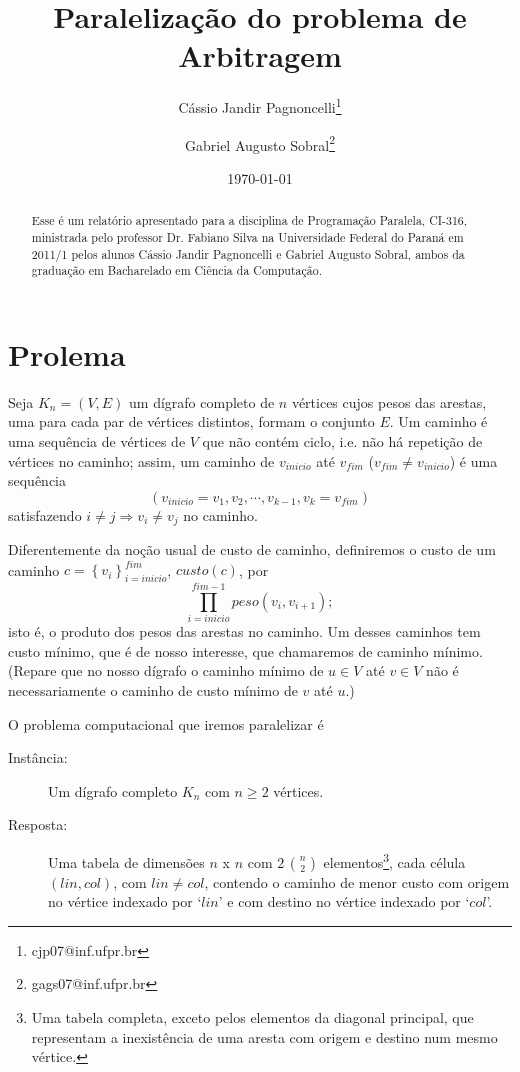\documentclass[a4paper,article,10pt]{article}
\title{{\Huge Paralelização do problema de Arbitragem}}
\author{\small Cássio Jandir Pagnoncelli\footnote{cjp07@inf.ufpr.br}
   \and \small Gabriel Augusto Sobral\footnote{gags07@inf.ufpr.br}}
\date{\scriptsize \today}
\newcommand{\implica}{\Rightarrow}
\newcommand{\chaves}[1] {{\left \{ {#1} \right \}}}
\begin{document}
\maketitle

  \begin{abstract}
    \scriptsize
    Esse é um relatório apresentado para a disciplina de Programação Paralela,
    CI-316, ministrada pelo professor Dr. Fabiano Silva na Universidade Federal
    do Paraná em 2011/1 pelos alunos Cássio Jandir Pagnoncelli e Gabriel Augusto
    Sobral, ambos da graduação em Bacharelado em Ciência da Computação.
  \end{abstract}

  \section{Prolema}

    Seja $K_n = (V,E)$ um dígrafo completo de $n$ vértices cujos pesos das
    arestas, uma para cada par de vértices distintos, formam o conjunto $E$.
    Um caminho é uma sequência de vértices de $V$ que não contém ciclo, i.e. não
    há repetição de vértices no caminho; assim, um caminho de $v_{inicio}$ até
    $v_{fim}$ ($v_{fim} \ne v_{inicio}$) é uma sequência
    \begin{equation*}
      (v_{inicio} = v_1, v_2, \cdots, v_{k-1}, v_k = v_{fim})
    \end{equation*}
    satisfazendo $i\ne j \implica v_i \ne v_j$ no caminho.

    Diferentemente da noção usual de custo de caminho, definiremos o custo de um
    caminho $c = \chaves{v_i}_{i=inicio}^{fim}$, $custo(c)$, por
    \begin{equation*}
      \prod_{i=inicio}^{fim-1} peso(v_i, v_{i+1});
    \end{equation*}
    isto é, o produto dos pesos das arestas no caminho. 
    Um desses caminhos tem custo mínimo, que é de nosso interesse, que
    chamaremos de caminho mínimo.
    (Repare que no nosso dígrafo o caminho mínimo de $u\in V$ até $v\in V$ não é
    necessariamente o caminho de custo mínimo de $v$ até $u$.)

    O problema computacional que iremos paralelizar é
    \begin{description}
    \item [Instância:] Um dígrafo completo $K_n$ com $n\geq 2$ vértices.
    \item [Resposta:] Uma tabela de dimensões $n$ x $n$ com $2\,\binom{n}{2}$
      elementos\footnote{Uma tabela completa, exceto pelos elementos da diagonal
      principal, que representam a inexistência de uma aresta com origem e
      destino num mesmo vértice.}, cada célula $(lin,col)$, com $lin\ne col$,
      contendo o caminho de menor custo com origem no vértice indexado por
      `$lin$' e com destino no vértice indexado por `$col$'.
    \end{description}
\end{document}
